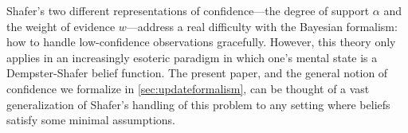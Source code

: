 \documentclass{uai2023}
\theoremstyle{plain}
\theoremstyle{definition}
\begin{document}
Shafer's two different representations of confidence---the
degree of support $\alpha$ and the weight of evidence $w$---address
a real difficulty with the Bayesian formalism: how to handle
low-confidence observations gracefully. 
However, this theory only applies in an increasingly esoteric paradigm in which
one's mental state is a Dempster-Shafer belief function. 
The present paper, and the general notion of confidence we
formalize in \cref{sec:updateformalism}, can be thought of a vast
generalization of Shafer's handling of this problem to any setting
where beliefs satisfy some minimal assumptions.
\end{document}
